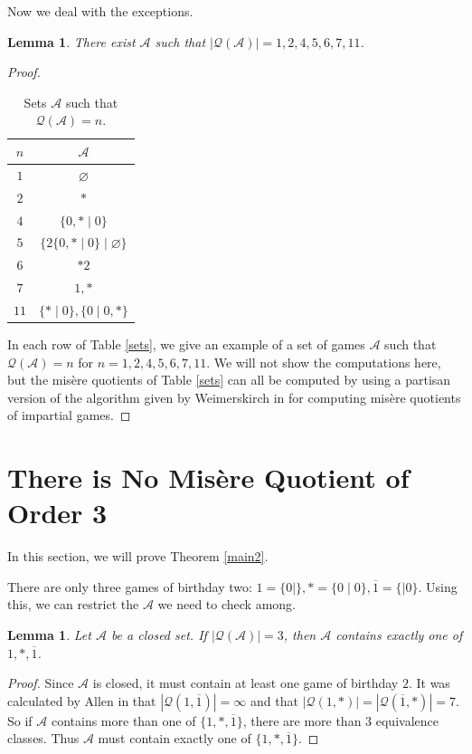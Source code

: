 \documentclass{amsart}
\theoremstyle{plain}
\newtheorem{lemma}[thm]{Lemma}
\theoremstyle{definition}
\theoremstyle{remark}
\numberwithin{equation}{section}
\numberwithin{thm}{section}
\begin{document}
Now we deal with the exceptions.
\begin{lemma}
    There exist $\mathscr{A}$ such that $|\mathcal{Q}(\mathscr{A})| = 1,2,4,5,6,7,11$.
\end{lemma}
\begin{proof}

\begin{table}
\label{sets}
    \centering
    \begin{tabular}{|c|c|}
    \hline
         $n$& $\mathscr{A}$\\
         \hline
         $1$ & $\varnothing$\\
         \hline
         $2$&$*$\\
         \hline
          $4$& $\{0,*\mid 0\} $\\
         \hline
         $5$ &$  \{ 2 \{0,*\mid 0 \} \mid \varnothing \} $\\
         \hline
         $6$&$*2$ \\
         \hline
       $7$& $1,*$  \\
        \hline
        $11$& $\{*\mid0\}, \{0\mid 0,*\}$ \\
        \hline
    \end{tabular}
    \caption{Sets $\mathscr{A}$ such that $\mathcal{Q}(\mathscr{A}) = n$.}
    \label{tab:placeholder}
\end{table}
In each row of Table \ref{sets}, we give an example of a set of games $\mathscr{A}$ such that $\mathcal{Q}(\mathscr{A}) = n$ for $n = 1,2,4,5,6,7,11$.
We will not show the computations here, but the mis\`ere quotients of Table \ref{sets} can all be computed by using a partisan version of the algorithm given by Weimerskirch in \cite{weimerskirch} for computing mis\`ere quotients of impartial games. 
\end{proof}
\section{There is No Mis\`ere Quotient of Order 3}
\label{impossibility}
In this section, we will prove Theorem \ref{main2}.

There are only three games of birthday two: $1 = \{0\mid \}, * = \{ 0\mid 0\}, \overline{1} = \{ \mid 0\}$. 
Using this, we can restrict the $\mathscr{A}$ we need to check among. 
\begin{lemma}
  \label{root}
    Let $\mathscr{A}$ be a closed set. If $|\mathcal{Q}(\mathscr{A}) | = 3$, then $\mathscr{A}$ contains exactly one of $1,*,\overline{1}$.
\end{lemma}
\begin{proof}
    Since $\mathscr{A}$ is closed, it must contain at least one game of birthday $2$. It was calculated by Allen in \cite{allenthesis} that $|\mathcal{Q}(1,\overline{1})| = \infty$ and that $|\mathcal{Q}(1,*) |=|\mathcal{Q}(\overline{1},*) |= 7$. So if $\mathscr{A}$ contains more than one of $\{1,*,\overline{1}\}$, there are more than $3$ equivalence classes. Thus $\mathscr{A}$ must contain exactly one of $\{1,*,\overline{1}\}$.
\end{proof}
\end{document}
